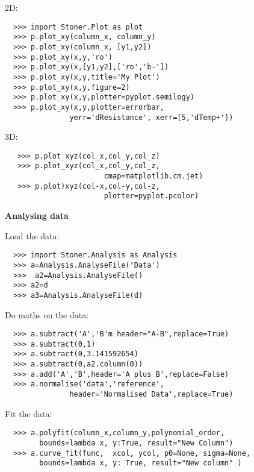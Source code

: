 \documentclass[a4paper,9pt,threecolumn,landscape]{scrartcl}
\begin{document}
\begin{multicols}{3}
{2D:
\begin{verbatim}
  >>> import Stoner.Plot as plot
  >>> p.plot_xy(column_x, column_y)
  >>> p.plot_xy(column_x, [y1,y2])
  >>> p.plot_xy(x,y,'ro')
  >>> p.plot_xy(x,[y1,y2],['ro','b-'])
  >>> p.plot_xy(x,y,title='My Plot')
  >>> p.plot_xy(x,y,figure=2)
  >>> p.plot_xy(x,y,plotter=pyplot.semilogy)
  >>> p.plot_xy(x,y,plotter=errorbar,
               yerr='dResistance', xerr=[5,'dTemp+'])
\end{verbatim}
3D:
\begin{verbatim}
   >>> p.plot_xyz(col_x,col_y,col_z)
   >>> p.plot_xyz(col_x,col_y,col_z,
                       cmap=matplotlib.cm.jet)
   >>> p.plot)xyz(col-x,col-y,col-z,
                       plotter=pyplot.pcolor)
 \end{verbatim}

\vspace{0.5cm}
\textbf {Analysing data}
\vspace{0.2cm}\normalfont

Load the data:
\begin{verbatim}
  >>> import Stoner.Analysis as Analysis
  >>> a=Analysis.AnalyseFile('Data')
  >>>  a2=Analysis.AnalyseFile()
  >>> a2=d
  >>> a3=Analysis.AnalyseFile(d)
\end{verbatim}

Do maths on the data:
\begin{verbatim}
  >>> a.subtract('A','B'm header="A-B",replace=True)
  >>> a.subtract(0,1)
  >>> a.subtract(0,3.141592654)
  >>> a.subtract(0,a2.column(0))
  >>> a.add('A','B',header='A plus B',replace=False)
  >>> a.normalise('data','reference',
               header='Normalised Data',replace=True)
\end{verbatim}

Fit the data:
\begin{verbatim}
  >>> a.polyfit(column_x,column_y,polynomial_order, 
        bounds=lambda x, y:True, result="New Column")
  >>> a.curve_fit(func,  xcol, ycol, p0=None, sigma=None,
        bounds=lambda x, y: True, result="New column" )
\end{verbatim}


 

}%
\end{multicols}
\end{document}
